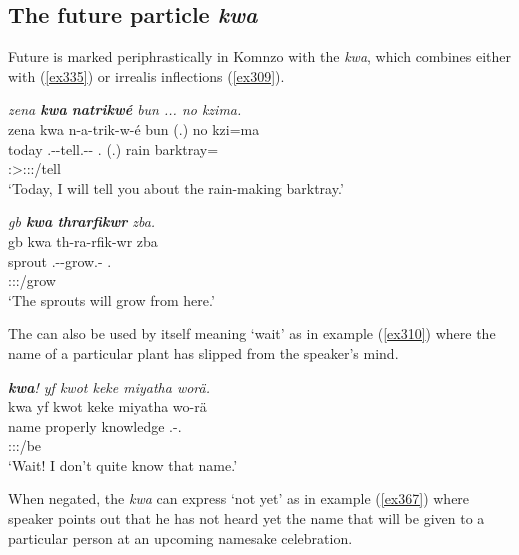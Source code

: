\subsection{The future particle \emph{kwa}}\label{futurekwa}

Future is marked periphrastically in Komnzo with the  \emph{kwa}, which combines either with  (\ref{ex335}) or irrealis inflections (\ref{ex309}).

\begin{exe}
 	\ex \emph{zena \textbf{kwa} \textbf{natrikwé} bun ... no kzima.}\\
 	\glll zena kwa n-a-trik-w-é bun (.) no kzi=ma\\
 	today \Fut{} \Ssg.\Alph-\Vc-tell.\Ext-\Ndu-\Fsg{} \Ssg.\Dat{} (.) rain barktray=\Char{}\\
	{} {} \footnotesize{\Fsg:\Sbj>\Ssg:\Io:\Nonpast:\Ipfv/tell} {} {} {}\\
 	\trans `Today, I will tell you about the rain-making barktray.'
 	\label{ex335}
\end{exe}
\begin{exe}
 	\ex \emph{gb \textbf{kwa} \textbf{thrarfikwr} zba.}\\
 	\glll gb kwa th-ra-rfik-wr zba\\
 	sprout \Fut{} \Stnsg.\Bet-\Irr-grow.\Ext-\Ndu{} \Prox.\Abl\\
	{} {} \footnotesize{\Stpl:\Sbj:\Irr:\Ipfv/grow} {}\\
 	\trans `The sprouts will grow from here.'
 	\label{ex309}
\end{exe}

The   can also be used by itself meaning `wait' as in example (\ref{ex310}) where the name of a particular plant has slipped from the speaker's mind.

\begin{exe}
	\ex \emph{\textbf{kwa}! yf kwot keke miyatha worä.}\\
	\glll kwa yf kwot keke miyatha wo-rä\\
	\Fut{} name properly \Neg{} knowledge \Fsg.\Alph-\Cop.\Ndu\\
	{} {} {} {} {} \footnotesize{\Fsg:\Sbj:\Nonpast:\Ipfv/be}\\
	\trans `Wait! I don't quite know that name.'
	\label{ex310}
\end{exe}

When negated, the   \emph{kwa} can express `not yet' as in example (\ref{ex367}) where speaker points out that he has not heard yet the name that will be given to a particular person at an upcoming namesake celebration.

